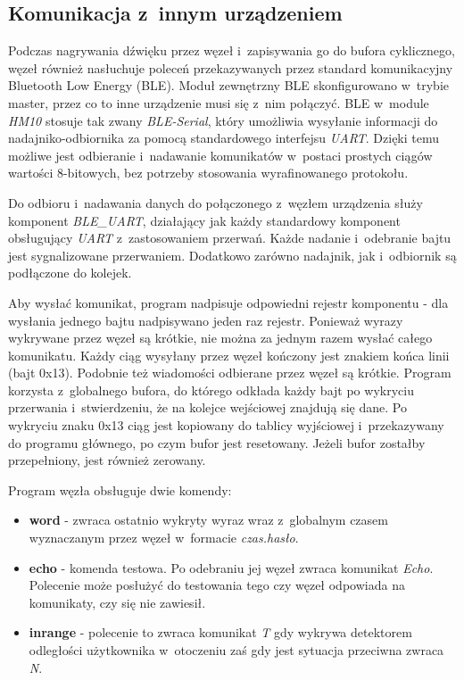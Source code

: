\subsection{Komunikacja z~innym urządzeniem}
Podczas nagrywania dźwięku przez węzeł i~zapisywania go do bufora cyklicznego, węzeł również nasłuchuje poleceń przekazywanych przez standard komunikacyjny Bluetooth Low Energy (BLE). Moduł zewnętrzny BLE skonfigurowano w~trybie master, przez co to inne urządzenie musi się z~nim połączyć. BLE w~module \textit{HM10} stosuje tak zwany \textit{BLE-Serial}, który umożliwia wysyłanie informacji do nadajniko-odbiornika za pomocą standardowego interfejsu \textit{UART}. Dzięki temu możliwe jest odbieranie i~nadawanie komunikatów w~postaci prostych ciągów wartości 8-bitowych, bez potrzeby stosowania wyrafinowanego protokołu.

Do odbioru i~nadawania danych do połączonego z~węzłem urządzenia służy komponent \textit{BLE\_UART}, działający jak każdy standardowy komponent obsługujący \textit{UART} z~zastosowaniem przerwań. Każde nadanie i~odebranie bajtu jest sygnalizowane przerwaniem. Dodatkowo zarówno nadajnik, jak i~odbiornik są podłączone do kolejek.

Aby wysłać komunikat, program nadpisuje odpowiedni rejestr komponentu - dla wysłania jednego bajtu nadpisywano jeden raz rejestr. Ponieważ wyrazy wykrywane przez węzeł są krótkie, nie można za jednym razem wysłać całego komunikatu. Każdy ciąg wysyłany przez węzeł kończony jest znakiem końca linii (bajt 0x13). Podobnie też wiadomości odbierane przez węzeł są krótkie. Program korzysta z~globalnego bufora, do którego odkłada każdy bajt po wykryciu przerwania i~stwierdzeniu, że na kolejce wejściowej znajdują się dane. Po wykryciu znaku 0x13 ciąg jest kopiowany do tablicy wyjściowej i~przekazywany do programu głównego, po czym bufor jest resetowany. Jeżeli bufor zostałby przepełniony, jest również zerowany.

Program węzła obsługuje dwie komendy:
\begin{itemize}
	\item \textbf{word} - zwraca ostatnio wykryty wyraz wraz z~globalnym czasem wyznaczanym przez węzeł w~formacie \textit{czas.hasło}.
	\item \textbf{echo} - komenda testowa. Po odebraniu jej węzeł zwraca komunikat \textit{Echo}. Polecenie może posłużyć do testowania tego czy węzeł odpowiada na komunikaty, czy się nie zawiesił.
	\item \textbf{inrange} - polecenie to zwraca komunikat \textit{T} gdy wykrywa detektorem odległości użytkownika w~otoczeniu zaś gdy jest sytuacja przeciwna zwraca \textit{N}.
\end{itemize}

